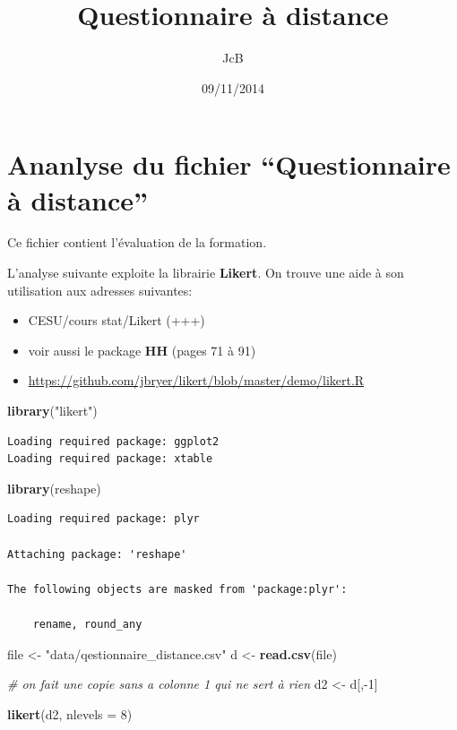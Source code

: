 \documentclass[]{article}
\title{Questionnaire à distance}
\author{JcB}
\date{09/11/2014}
\newenvironment{Shaded}{\begin{snugshade}}{\end{snugshade}}
\newcommand{\KeywordTok}[1]{\textcolor[rgb]{0.13,0.29,0.53}{\textbf{{#1}}}}
\newcommand{\DataTypeTok}[1]{\textcolor[rgb]{0.13,0.29,0.53}{{#1}}}
\newcommand{\DecValTok}[1]{\textcolor[rgb]{0.00,0.00,0.81}{{#1}}}
\newcommand{\StringTok}[1]{\textcolor[rgb]{0.31,0.60,0.02}{{#1}}}
\newcommand{\CommentTok}[1]{\textcolor[rgb]{0.56,0.35,0.01}{\textit{{#1}}}}
\newcommand{\NormalTok}[1]{{#1}}
\begin{document}
\maketitle


\section{Ananlyse du fichier ``Questionnaire à
distance''}\label{ananlyse-du-fichier-questionnaire-a-distance}

Ce fichier contient l'évaluation de la formation.

L'analyse suivante exploite la librairie \textbf{Likert}. On trouve une
aide à son utilisation aux adresses suivantes:

\begin{itemize}
\itemsep1pt\parskip0pt
\item
  CESU/cours stat/Likert (+++)
\item
  voir aussi le package \textbf{HH} (pages 71 à 91)
\item
  \url{https://github.com/jbryer/likert/blob/master/demo/likert.R}
\end{itemize}

\begin{Shaded}
\begin{Highlighting}[]
\KeywordTok{library}\NormalTok{(}\StringTok{"likert"}\NormalTok{)}
\end{Highlighting}
\end{Shaded}

\begin{verbatim}
Loading required package: ggplot2
Loading required package: xtable
\end{verbatim}

\begin{Shaded}
\begin{Highlighting}[]
\KeywordTok{library}\NormalTok{(reshape)}
\end{Highlighting}
\end{Shaded}

\begin{verbatim}
Loading required package: plyr

Attaching package: 'reshape'

The following objects are masked from 'package:plyr':

    rename, round_any
\end{verbatim}

\begin{Shaded}
\begin{Highlighting}[]
\NormalTok{file <-}\StringTok{ "data/qestionnaire_distance.csv"}
\NormalTok{d <-}\StringTok{ }\KeywordTok{read.csv}\NormalTok{(file)}

\CommentTok{# on fait une copie sans a colonne 1 qui ne sert à rien}
\NormalTok{d2 <-}\StringTok{ }\NormalTok{d[,-}\DecValTok{1}\NormalTok{]}

\KeywordTok{likert}\NormalTok{(d2, }\DataTypeTok{nlevels =} \DecValTok{8}\NormalTok{)}
\end{Highlighting}
\end{Shaded}
\end{document}

